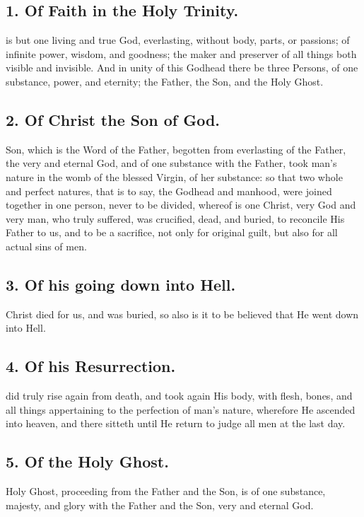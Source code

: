 \subsection{1.  Of Faith in the Holy Trinity.}
 is but one living and true God, everlasting, without body, parts, or passions; of infinite power, wisdom, and goodness; the maker and preserver of all things both visible and invisible. And in unity of this Godhead there be three Persons, of one substance, power, and eternity; the Father, the Son, and the Holy Ghost.

\newpage

\subsection{2.  Of Christ the Son of God.}
 Son, which is the Word of the Father, begotten from everlasting of the Father, the very and eternal God, and of one substance with the Father, took man's nature in the womb of the blessed Virgin, of her substance: so that two whole and perfect natures, that is to say, the Godhead and manhood, were joined together in one person, never to be divided, whereof is one Christ, very God and very man, who truly suffered, was crucified, dead, and buried, to reconcile His Father to us, and to be a sacrifice, not only for original guilt, but also for all actual sins of men.

\subsection{3.  Of his going down into Hell.}
 Christ died for us, and was buried, so also is it to be believed that He went down into Hell.

\subsection{4.  Of his Resurrection.}
 did truly rise again from death, and took again His body, with flesh, bones, and all things appertaining to the perfection of man's nature, wherefore He ascended into heaven, and there sitteth until He return to judge all men at the last day.

\subsection{5.  Of the Holy Ghost.}
 Holy Ghost, proceeding from the Father and the Son, is of one substance, majesty, and glory with the Father and the Son, very and eternal God.

